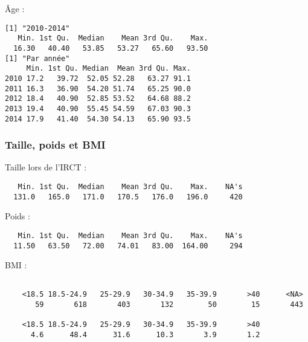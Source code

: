 \documentclass[11pt,a4paper]{article}\usepackage[]{graphicx}\usepackage[]{color}
\makeatletter
\newenvironment{kframe}{%
 \def\at@end@of@kframe{}%
 \ifinner\ifhmode%
  \def\at@end@of@kframe{\end{minipage}}%
  \begin{minipage}{\columnwidth}%
 \fi\fi%
 \def\FrameCommand##1{\hskip\@totalleftmargin \hskip-\fboxsep
 \colorbox{shadecolor}{##1}\hskip-\fboxsep
     \hskip-\linewidth \hskip-\@totalleftmargin \hskip\columnwidth}%
 \MakeFramed {\advance\hsize-\width
   \@totalleftmargin\z@ \linewidth\hsize
   \@setminipage}}%
 {\par\unskip\endMakeFramed%
 \at@end@of@kframe}
\newenvironment{knitrout}{}{} %
\makeatother
\begin{document}
Âge :
\begin{knitrout}
\color{fgcolor}\begin{kframe}
\begin{verbatim}
[1] "2010-2014"
   Min. 1st Qu.  Median    Mean 3rd Qu.    Max. 
  16.30   40.40   53.85   53.27   65.60   93.50 
[1] "Par année"
     Min. 1st Qu. Median  Mean 3rd Qu. Max.
2010 17.2   39.72  52.05 52.28   63.27 91.1
2011 16.3   36.90  54.20 51.74   65.25 90.0
2012 18.4   40.90  52.85 53.52   64.68 88.2
2013 19.4   40.90  55.45 54.59   67.03 90.3
2014 17.9   41.40  54.30 54.13   65.90 93.5
\end{verbatim}
\end{kframe}
\end{knitrout}

    \subsubsection{Taille, poids et BMI}
  
Taille lors de l'IRCT :
  
\begin{knitrout}
\color{fgcolor}\begin{kframe}
\begin{verbatim}
   Min. 1st Qu.  Median    Mean 3rd Qu.    Max.    NA's 
  131.0   165.0   171.0   170.5   176.0   196.0     420 
\end{verbatim}
\end{kframe}
\end{knitrout}

Poids :

\begin{knitrout}
\color{fgcolor}\begin{kframe}
\begin{verbatim}
   Min. 1st Qu.  Median    Mean 3rd Qu.    Max.    NA's 
  11.50   63.50   72.00   74.01   83.00  164.00     294 
\end{verbatim}
\end{kframe}
\end{knitrout}

BMI :

\begin{knitrout}
\color{fgcolor}\begin{kframe}
\begin{verbatim}

    <18.5 18.5-24.9   25-29.9   30-34.9   35-39.9       >40      <NA> 
       59       618       403       132        50        15       443 

    <18.5 18.5-24.9   25-29.9   30-34.9   35-39.9       >40 
      4.6      48.4      31.6      10.3       3.9       1.2 
\end{verbatim}
\end{kframe}
\end{knitrout}
\end{document}
